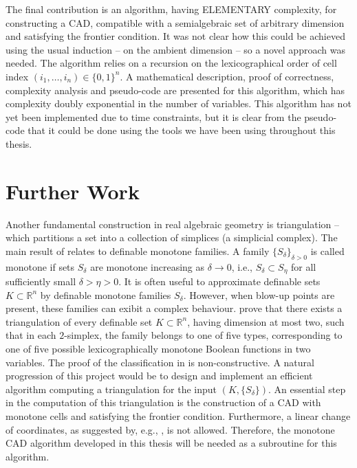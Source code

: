 \documentclass[
]{book}
\theoremstyle{definition}
\theoremstyle{definition}
\theoremstyle{definition}
\theoremstyle{definition}
\theoremstyle{remark}
\begin{document}
The final contribution is an algorithm, having ELEMENTARY complexity, for constructing a CAD, compatible with a semialgebraic set of arbitrary dimension and satisfying the frontier condition. It was not clear how this could be achieved using the usual induction -- on the ambient dimension -- so a novel approach was needed. The algorithm relies on a recursion on the lexicographical order of cell index \((i_1,\ldots,i_n) \in \{0,1\}^n\). A mathematical description, proof of correctness, complexity analysis and pseudo-code are presented for this algorithm, which has complexity doubly exponential in the number of variables. This algorithm has not yet been implemented due to time constraints, but it is clear from the pseudo-code that it could be done using the tools we have been using throughout this thesis.

\hypertarget{further-work}{%
\section{Further Work}\label{further-work}}

Another fundamental construction in real algebraic geometry is triangulation -- which partitions a set into a collection of simplices (a simplicial complex).
The main result of \citet{bgv15} relates to definable monotone families.
A family \(\{ S_\delta \}_{\delta >0}\) is called monotone if sets \(S_\delta\) are monotone
increasing as \(\delta \to 0\), i.e., \(S_\delta \subset S_\eta\) for all sufficiently small \(\delta > \eta >0\).
It is often useful to approximate definable sets \(K \subset \mathbb{R}^n\) by definable monotone families \(S_{\delta}\). However, when blow-up points are present, these families can exibit a complex behaviour.
\citet{bgv15} prove that there exists a triangulation of every definable set \(K \subset \mathbb{R}^n\), having dimension at most two, such that in each \(2\)-simplex, the family belongs to one of five types, corresponding to one of five possible lexicographically monotone Boolean functions in two variables.
The proof of the classification in \citet{bgv15} is non-constructive.
A natural progression of this project would be to design and implement an efficient
algorithm computing a triangulation for the input \((K, \{ S_\delta \})\).
An essential step in the computation of this triangulation is the construction of a CAD with monotone cells and satisfying the frontier condition. Furthermore, a linear change of coordinates, as suggested by, e.g., \citet{pianomovers1983}, is not allowed. Therefore, the monotone CAD algorithm developed in this thesis will be needed as a subroutine for this algorithm.
\end{document}
